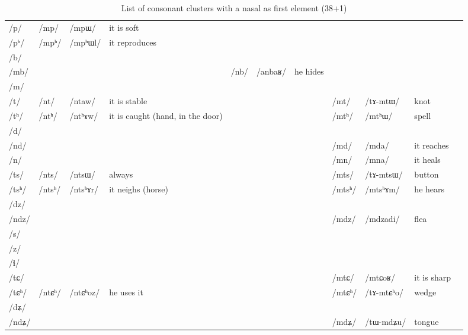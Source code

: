 \documentclass[oldfontcommands,oneside,a4paper,11pt]{article}
\newcommand{\ipa}[1]{\mbox{/#1/}} %
\newcommand{\deux}[1]{/#1/}
\newcommand{\tib}[1]{\cellcolor{lightgray}\textbf{#1}}
\begin{document}
\begin{landscape}
 \begin{longtable}{l|lll|lll|lll|l}
 \caption{List of consonant clusters with a nasal as   first element (38+1)} \\%
\toprule
\ipa{p} 	& \deux{mp} 	& \ipa{mpɯ} 	& it is soft	& 	& 	& 	& 	& 	&  \\
\ipa{pʰ} 	& \deux{mpʰ} 	& \ipa{mpʰɯl} 	&it reproduces  	& 	& 	& 	& 	& 	&  \\
\ipa{b} 	& 	& 	& 	& 	& 	& 	& 	& 	&  \\
\ipa{mb} 	& 	& 	& 	& \deux{nb} 	& \ipa{anbaʁ} 	& he hides	& 	& 	&  \\
\ipa{m} 	& 	& 	& 	& 	& 	& 	& 	& 	&  \\
\ipa{t} 	& \deux{nt} 	& \ipa{ntaw} 	&it is stable 	& 	& 	& 	& \deux{mt} 	& \ipa{tɤ-mtɯ} 	& knot \\
\ipa{tʰ} 	& \deux{ntʰ} 	& \ipa{ntʰɤw} 	& it is caught	(hand, in the door)& 	& 	& 	& \deux{mtʰ}\tib{} 	& \ipa{mtʰɯ} 	& spell \\
\ipa{d} 	& 	& 	& 	& 	& 	& 	& 	& 	&  \\
\ipa{nd} 	& 	& 	& 	& 	& 	& 	& \deux{md} 	& \ipa{mda} 	&it reaches  \\
\ipa{n} 	& 	& 	& 	& 	& 	& 	& \deux{mn} 	& \ipa{mna} 	& it heals \\
\ipa{ts} 	& \deux{nts} 	& \ipa{ntsɯ} 	& always	& 	& 	& 	& \deux{mts} 	& \ipa{tɤ-mtsɯ} 	& button \\
\ipa{tsʰ} 	& \deux{ntsʰ} 	& \ipa{ntsʰɤr} 	& it neighs (horse) 	& 	& 	& 	& \deux{mtsʰ} 	& \ipa{mtsʰɤm} 	& he hears \\
\ipa{dz} 	& 	& 	& 	& 	& 	& 	& 	& 	&  \\
\ipa{ndz} 	& 	& 	& 	& 	& 	& 	& \deux{mdz} 	& \ipa{mdzadi} 	& flea \\
\ipa{s} 	& 	& 	& 	& 	& 	& 	& 	& 	&  \\
\ipa{z} 	& 	& 	& 	& 	& 	& 	& 	& 	&  \\
\ipa{ɬ} 	& 	& 	& 	& 	& 	& 	& 	& 	&  \\
\ipa{tɕ} 	& 	& 	& 	& 	& 	& 	& \deux{mtɕ} 	& \ipa{mtɕoʁ} 	& it is sharp \\
\ipa{tɕʰ} 	& \deux{ntɕʰ} 	& \ipa{ntɕʰoz} 	&he uses it 	& 	& 	& 	& \deux{mtɕʰ} 	& \ipa{tɤ-mtɕʰo} 	& wedge \\
\ipa{dʑ} 	& 	& 	& 	& 	& 	& 	& 	& 	&  \\
\ipa{ndʑ} 	& 	& 	& 	& 	& 	& 	& \deux{mdʑ} 	& \ipa{tɯ-mdʑu} 	& tongue \\

\end{longtable}
\end{landscape}
\end{document}
